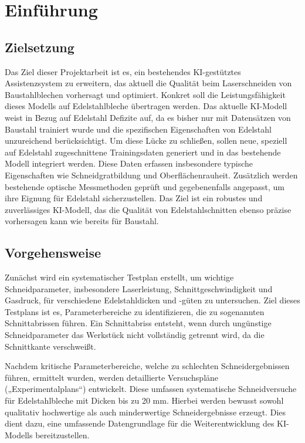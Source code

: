\chapter{Einführung}
\section{Zielsetzung}
Das Ziel dieser Projektarbeit ist es, ein bestehendes KI-gestütztes Assistenzsystem zu erweitern, das aktuell die Qualität beim Laserschneiden von Baustahlblechen vorhersagt und optimiert. Konkret soll die Leistungsfähigkeit dieses Modells auf Edelstahlbleche übertragen werden. Das aktuelle KI-Modell weist in Bezug auf Edelstahl Defizite auf, da es bisher nur mit Datensätzen von Baustahl trainiert wurde und die spezifischen Eigenschaften von Edelstahl unzureichend berücksichtigt.
Um diese Lücke zu schließen, sollen neue, speziell auf Edelstahl zugeschnittene Trainingsdaten generiert und in das bestehende Modell integriert werden. Diese Daten erfassen insbesondere typische Eigenschaften wie Schneidgratbildung und Oberflächenrauheit. Zusätzlich werden bestehende optische Messmethoden geprüft und gegebenenfalls angepasst, um ihre Eignung für Edelstahl sicherzustellen. Das Ziel ist ein robustes und zuverlässiges KI-Modell, das die Qualität von Edelstahlschnitten ebenso präzise vorhersagen kann wie bereits für Baustahl.

\section{Vorgehensweise}
Zunächst wird ein systematischer Testplan erstellt, um wichtige Schneidparameter, insbesondere Laserleistung, Schnittgeschwindigkeit und Gasdruck, für verschiedene Edelstahldicken und -güten zu untersuchen. Ziel dieses Testplans ist es, Parameterbereiche zu identifizieren, die zu sogenannten Schnittabrissen führen. Ein Schnittabriss entsteht, wenn durch ungünstige Schneidparameter das Werkstück nicht vollständig getrennt wird, da die Schnittkante verschweißt.

Nachdem kritische Parameterbereiche, welche zu schlechten Schneidergebnissen führen, ermittelt wurden, werden detaillierte Versuchspläne („Experimentalplans“) entwickelt. Diese umfassen systematische Schneidversuche für Edelstahlbleche mit Dicken bis zu 20 mm. Hierbei werden bewusst sowohl qualitativ hochwertige als auch minderwertige Schneidergebnisse erzeugt. Dies dient dazu, eine umfassende Datengrundlage für die Weiterentwicklung des KI-Modells bereitzustellen.

